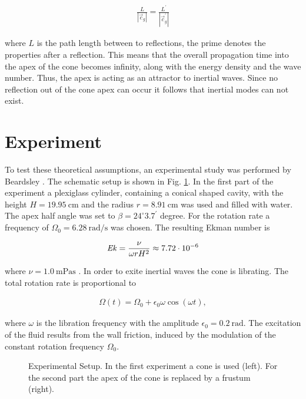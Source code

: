 \begin{align}
    \frac{L}{|\vec{c}_g|} = \frac{L^{\prime}}{|\vec{c}_g^{\prime}|}
\end{align}

where $L$ is the path length between to reflections, the prime denotes the properties after a reflection.
This means that the overall propagation time into the apex of the cone becomes infinity, along with the energy density and the wave number.
Thus, the apex is acting as an attractor to inertial waves.
Since no reflection out of the cone apex can occur it follows that  inertial modes can not exist.

\section{Experiment}
\label{cone:theorie_exp}

To test these theoretical assumptions, an experimental study was performed by Beardsley \citep{Beardsley1970}.
The schematic setup is shown in Fig. \ref{cone:setup_experiment}.
In the first part of the experiment a plexiglass cylinder, containing a conical shaped cavity,
with the height $H=\SI{19.95}{\centi\meter}$ and the radius $r=\SI{8.91}{\centi\meter}$ was used and filled with water.
The apex half angle was set to $\beta=24^{\circ}3.7^{\prime}$ degree.
For the rotation rate a frequency of $\Omega_0 =\SI{6.28}{\radian\per\second}$ was chosen.
The resulting Ekman number is

\begin{align}
    \mbox{\textit{Ek}} = \frac{\nu}{\omega r H^2} \approx 7.72\cdot 10^{-6}
\end{align}

where $\nu = \SI{1.0}{\milli\pascal\second}$  \citep{tipler2003}.
In order to exite inertial waves the cone is librating.
The total rotation rate is proportional to

\begin{align}
\Omega(t) = \Omega_0 + \epsilon_0 \omega \cos(\omega t),
\end{align}

where $\omega$ is the libration frequency with the amplitude $\epsilon_0=\SI{0.2}{\radian}$.
The excitation of the fluid results from the wall friction, induced
by the modulation of the constant rotation frequency $\Omega_0$.

\begin{figure}[!b]
      \centering
      \caption{
          Experimental Setup. In the first experiment a cone is used (left). For the second part the apex of the cone
          is replaced by a frustum (right).
      \label{cone:setup_experiment}
      }
\end{figure}

